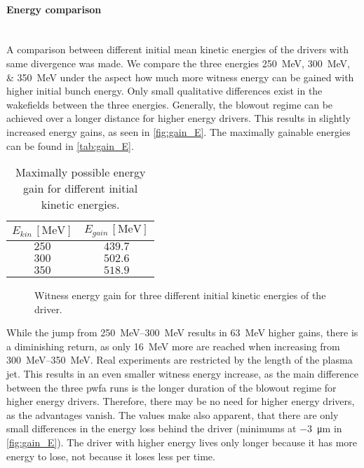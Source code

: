 \documentclass[bachelor_thesis]{subfiles}
\begin{document}
\paragraph*{Energy comparison}\hspace{0pt} \\
A comparison between different initial mean kinetic energies of the drivers with same divergence was made. We compare the three energies \qtylist{250; 300; 350}{\MeV} under the aspect how much more witness energy can be gained with higher initial bunch energy.
Only small qualitative differences exist in the wakefields between the three energies. Generally, the blowout regime can be achieved over a longer distance for higher energy drivers.
This results in slightly increased energy gains, as seen in \autoref{fig:gain_E}. The maximally gainable energies can be found in \autoref{tab:gain_E}.
\begin{table}[h]
\begin{center}
\begin{tabular}{|c|c|} 
	\hline
 	$E_{kin} \, \mathrm{[MeV]}$ & $E_{gain} \, \mathrm{[MeV]}$ \\ 
 	\hline
	$250$ & $439.7$ \\ 
 	$300$ & $502.6$ \\
	$350$ & $518.9$ \\
	\hline
\end{tabular}
\caption{Maximally possible energy gain for different initial kinetic energies.}\label{tab:gain_E}
\end{center}
\end{table}

\begin{figure}
	\centering
	
	\caption{Witness energy gain for three different initial kinetic energies of the driver.}
	\label{fig:gain_E}
\end{figure}

While the jump from \qtyrange{250}{300}{\MeV} results in \qty{63}{\MeV} higher gains, there is a diminishing return, as only \qty{16}{\MeV} more are reached when increasing from \qtyrange{300}{350}{\MeV}. Real experiments are restricted by the length of the plasma jet.
This results in an even smaller witness energy increase, as the main difference between the three \gls{pwfa} runs is the longer duration of the blowout regime for higher energy drivers. Therefore, there may be no need for higher energy drivers, as the advantages vanish.
The values make also apparent, that there are only small differences in the energy loss behind the driver (minimums at \qty{-3}{\um} in \autoref{fig:gain_E}). The driver with higher energy lives only longer because it has more energy to lose, not because it loses less per time.
\end{document}

